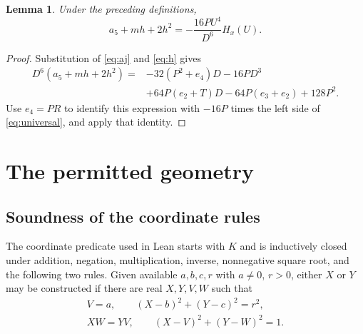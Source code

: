 \documentclass[noproofs]{rmj-public}
\newtheorem{lemma}[thm]{Lemma}
\theoremstyle{definition}
\numberwithin{equation}{section}
\begin{document}
\begin{lemma}\label{lem:signed}
Under the preceding definitions,
\begin{equation}\label{eq:signed}
a_5+mh+2h^2=-\frac{16PU^4}{D^6}H_x(U).
\end{equation}
\end{lemma}
\begin{proof}
Substitution of \eqref{eq:aj} and \eqref{eq:h} gives
\begin{align*}
D^6(a_5+mh+2h^2)
={}&-32(P^2+e_4)D-16PD^3\\
&+64P(e_2+T)D-64P(e_3+e_2)+128P^2.
\end{align*}
Use $e_4=PR$ to identify this expression with $-16P$ times
the left side of \eqref{eq:universal}, and apply that identity.
\end{proof}

\section{The permitted geometry}\label{sec:geometry}

\subsection{Soundness of the coordinate rules}
The coordinate predicate used in Lean starts with $K$ and is inductively
closed under addition, negation, multiplication, inverse, nonnegative
square root, and the following two rules. Given available $a,b,c,r$ with
$a\ne0$, $r>0$, either $X$ or $Y$ may be constructed if there are real
$X,Y,V,W$ such that
\begin{equation}\label{eq:constraints}
\begin{gathered}
V=a,\qquad (X-b)^2+(Y-c)^2=r^2,\\
XW=YV,\qquad (X-V)^2+(Y-W)^2=1.
\end{gathered}
\end{equation}
\end{document}

